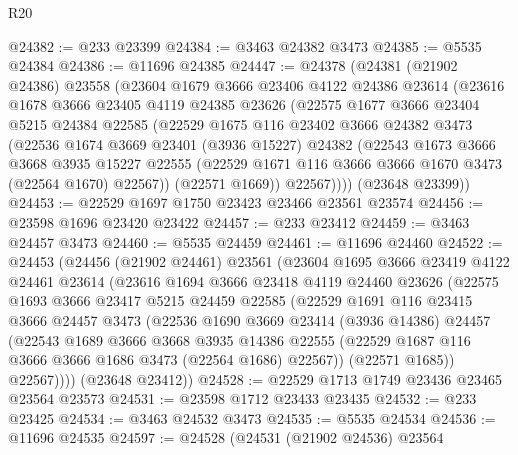 \begin{lexlean}{R20}
\begin{coremodule}
@24382 := @233 @23399
@24384 := @3463 @24382 @3473
@24385 := @5535 @24384
@24386 := @11696 @24385
@24447 := @24378
    (@24381
      (@21902 @24386)
      @23558
      (@23604
        @1679
        @3666
        @23406
        @4122
        @24386
        @23614
        (@23616
          @1678
          @3666
          @23405
          @4119
          @24385
          @23626
          (@22575
            @1677
            @3666
            @23404
            @5215
            @24384
            @22585
            (@22529
              @1675
              @116
              @23402
              @3666
              @24382
              @3473
              (@22536
                @1674
                @3669
                @23401
                (@3936 @15227)
                @24382
                (@22543
                  @1673
                  @3666
                  @3668
                  @3935
                  @15227
                  @22555
                  (@22529 @1671 @116 @3666 @3666 @1670 @3473 (@22564 @1670) @22567))
                (@22571 @1669))
              @22567))))
      (@23648 @23399))
@24453 := @22529 @1697 @1750 @23423 @23466 @23561 @23574
@24456 := @23598 @1696 @23420 @23422
@24457 := @233 @23412
@24459 := @3463 @24457 @3473
@24460 := @5535 @24459
@24461 := @11696 @24460
@24522 := @24453
    (@24456
      (@21902 @24461)
      @23561
      (@23604
        @1695
        @3666
        @23419
        @4122
        @24461
        @23614
        (@23616
          @1694
          @3666
          @23418
          @4119
          @24460
          @23626
          (@22575
            @1693
            @3666
            @23417
            @5215
            @24459
            @22585
            (@22529
              @1691
              @116
              @23415
              @3666
              @24457
              @3473
              (@22536
                @1690
                @3669
                @23414
                (@3936 @14386)
                @24457
                (@22543
                  @1689
                  @3666
                  @3668
                  @3935
                  @14386
                  @22555
                  (@22529 @1687 @116 @3666 @3666 @1686 @3473 (@22564 @1686) @22567))
                (@22571 @1685))
              @22567))))
      (@23648 @23412))
@24528 := @22529 @1713 @1749 @23436 @23465 @23564 @23573
@24531 := @23598 @1712 @23433 @23435
@24532 := @233 @23425
@24534 := @3463 @24532 @3473
@24535 := @5535 @24534
@24536 := @11696 @24535
@24597 := @24528
    (@24531
      (@21902 @24536)
      @23564

\end{coremodule}
\end{lexlean}
